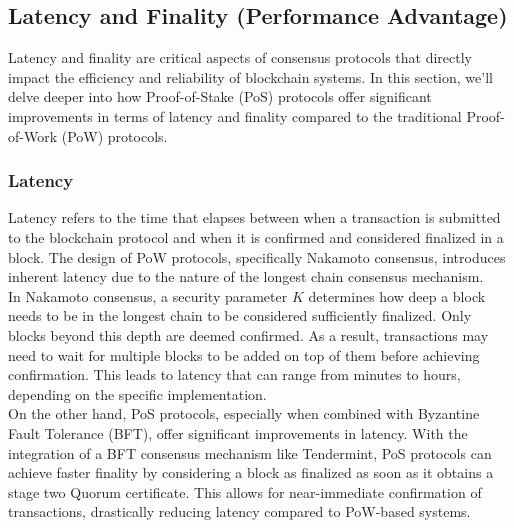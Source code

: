 \subsection{Latency and Finality (Performance Advantage)}
Latency and finality are critical aspects of consensus protocols that directly impact the efficiency and reliability of blockchain systems. In this section, we'll delve deeper into how Proof-of-Stake (PoS) protocols offer significant improvements in terms of latency and finality compared to the traditional Proof-of-Work (PoW) protocols.
\subsubsection{Latency}
Latency refers to the time that elapses between when a transaction is submitted to the blockchain protocol and when it is confirmed and considered finalized in a block. The design of PoW protocols, specifically Nakamoto consensus, introduces inherent latency due to the nature of the longest chain consensus mechanism.\\
In Nakamoto consensus, a security parameter $K$ determines how deep a block needs to be in the longest chain to be considered sufficiently finalized. Only blocks beyond this depth are deemed confirmed. As a result, transactions may need to wait for multiple blocks to be added on top of them before achieving confirmation. This leads to latency that can range from minutes to hours, depending on the specific implementation.\\
On the other hand, PoS protocols, especially when combined with Byzantine Fault Tolerance (BFT), offer significant improvements in latency. With the integration of a BFT consensus mechanism like Tendermint, PoS protocols can achieve faster finality by considering a block as finalized as soon as it obtains a stage two Quorum certificate. This allows for near-immediate confirmation of transactions, drastically reducing latency compared to PoW-based systems.

